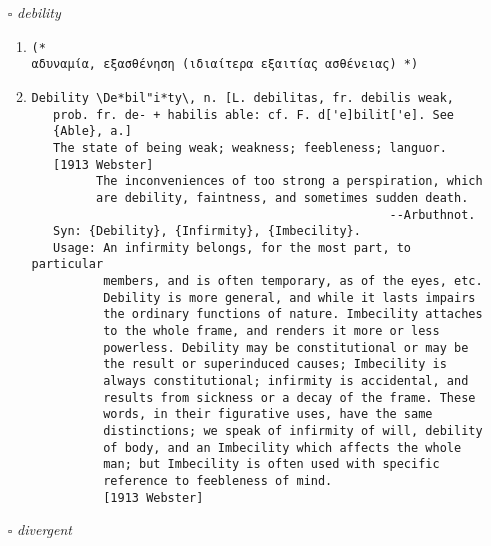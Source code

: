 \documentclass{article}
\begin{document}
\begin{itemize}
\begin{enumerate}
\item{
\begin{lstlisting}
(*  *)
\end{lstlisting}}
\item{
\begin{lstlisting}
Decrepitude \De*crep"i*tude\, n. [Cf. F. d['e]cr['e]pitude.]
   The broken state produced by decay and the infirmities of
   age; infirm old age.
   [1913 Webster] ||
\end{lstlisting}}
\end{enumerate}
\item[$\square$] \emph{ debility }
\begin{enumerate}
\item{
\begin{lstlisting}
(* 
αδυναμία, εξασθένηση (ιδιαίτερα εξαιτίας ασθένειας) *)
\end{lstlisting}}
\item{
\begin{lstlisting}
Debility \De*bil"i*ty\, n. [L. debilitas, fr. debilis weak,
   prob. fr. de- + habilis able: cf. F. d['e]bilit['e]. See
   {Able}, a.]
   The state of being weak; weakness; feebleness; languor.
   [1913 Webster]
         The inconveniences of too strong a perspiration, which
         are debility, faintness, and sometimes sudden death.
                                                  --Arbuthnot.
   Syn: {Debility}, {Infirmity}, {Imbecility}.
   Usage: An infirmity belongs, for the most part, to particular
          members, and is often temporary, as of the eyes, etc.
          Debility is more general, and while it lasts impairs
          the ordinary functions of nature. Imbecility attaches
          to the whole frame, and renders it more or less
          powerless. Debility may be constitutional or may be
          the result or superinduced causes; Imbecility is
          always constitutional; infirmity is accidental, and
          results from sickness or a decay of the frame. These
          words, in their figurative uses, have the same
          distinctions; we speak of infirmity of will, debility
          of body, and an Imbecility which affects the whole
          man; but Imbecility is often used with specific
          reference to feebleness of mind.
          [1913 Webster]
\end{lstlisting}}
\end{enumerate}
\item[$\square$] \emph{ divergent }
\begin{enumerate}

\end{enumerate}
\end{itemize}
\end{document}
